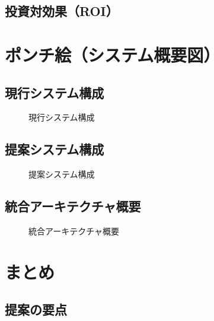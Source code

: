 \documentclass[12pt,a4paper]{jsarticle}
\begin{document}
\subsection{投資対効果（ROI）}

\section{ポンチ絵（システム概要図）}

\subsection{現行システム構成}
\begin{figure}[h]
\centering
\caption{現行システム構成}
\end{figure}

\subsection{提案システム構成}
\begin{figure}[h]
\centering
\caption{提案システム構成}
\end{figure}

\subsection{統合アーキテクチャ概要}
\begin{figure}[h]
\centering
\caption{統合アーキテクチャ概要}
\end{figure}

\section{まとめ}

\subsection{提案の要点}
\end{document}
